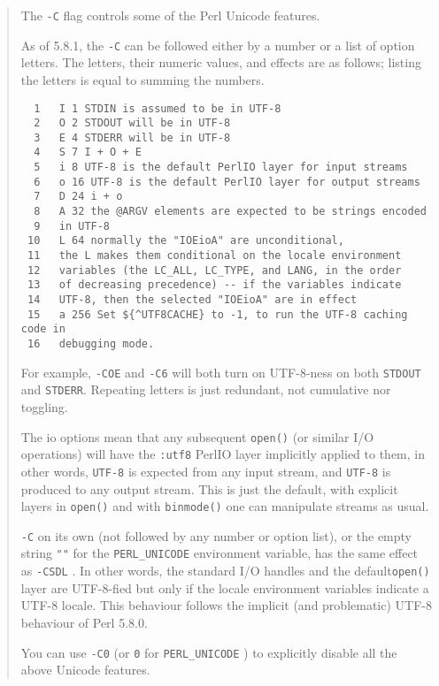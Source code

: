 \begin{it}
\begin{quotation}
The \verb|-C| flag controls some of the Perl Unicode features.

As of 5.8.1, the \verb|-C| can be followed either by a number or a list of option
letters. The letters, their numeric values, and effects are as follows;
listing the letters is equal to summing the numbers.

\begin{verbatim}
  1   I 1 STDIN is assumed to be in UTF-8
  2   O 2 STDOUT will be in UTF-8
  3   E 4 STDERR will be in UTF-8
  4   S 7 I + O + E
  5   i 8 UTF-8 is the default PerlIO layer for input streams
  6   o 16 UTF-8 is the default PerlIO layer for output streams
  7   D 24 i + o
  8   A 32 the @ARGV elements are expected to be strings encoded
  9   in UTF-8
 10   L 64 normally the "IOEioA" are unconditional,
 11   the L makes them conditional on the locale environment
 12   variables (the LC_ALL, LC_TYPE, and LANG, in the order
 13   of decreasing precedence) -- if the variables indicate
 14   UTF-8, then the selected "IOEioA" are in effect
 15   a 256 Set ${^UTF8CACHE} to -1, to run the UTF-8 caching code in
 16   debugging mode.
 \end{verbatim}

For example, \verb|-COE| and \verb|-C6| will both turn on UTF-8-ness
on both \verb|STDOUT| and \verb|STDERR|. Repeating letters is just redundant, not
cumulative nor toggling.

The io options mean that any subsequent \verb|open()| (or similar I/O operations)
will have the \verb|:utf8| PerlIO layer implicitly applied to them, in other
words, \verb|UTF-8| is expected from any input stream, and \verb|UTF-8| is produced
to any output stream. This is just the default, with explicit layers in
\verb|open()| and with \verb|binmode()| one can manipulate streams as usual.

\verb|-C| on its own (not followed by any number or option list), or the empty string 
\verb|""| for the \verb|PERL_UNICODE| environment variable, has the same effect as \verb|-CSDL| . 
In other words, the standard I/O handles and the default\verb|open()| layer are 
UTF-8-fied but only if the locale environment variables indicate a
UTF-8 locale. This behaviour follows the implicit (and problematic)
UTF-8 behaviour of Perl 5.8.0.

You can use \verb|-C0| (or \verb"0" for \verb|PERL_UNICODE| ) to explicitly disable all
the above Unicode features.
\end{quotation}
\end{it}

